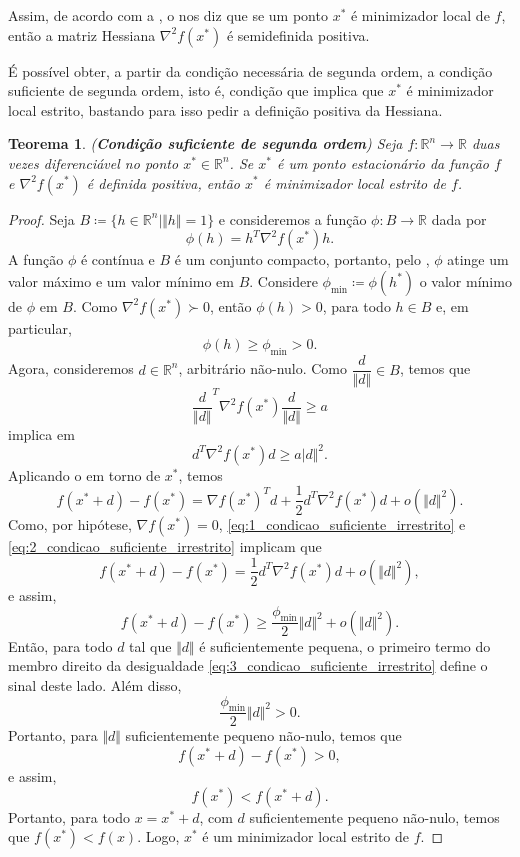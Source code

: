 \documentclass[12pt,a4paper]{scrartcl}
\def\RR{\mathds{R}}
\newtheorem{teo}{Teorema}
\theoremstyle{definition}%
\begin{document}
Assim, de acordo com a , o  nos diz que se um ponto $x^{*}$ é minimizador local de $f$, então a matriz Hessiana $\nabla^{2} f(x^{*})$ é semidefinida positiva.

É possível obter, a partir da condição necessária de segunda ordem, a condição suficiente de segunda ordem, isto é, condição que implica que $x^{*}$ é minimizador local estrito, bastando para isso pedir a definição positiva da Hessiana.

\begin{teo}(\textbf{Condição suficiente de segunda ordem}) \label{teo:condicao_suficiente_irrestrito}
Seja $f:\RR^{n} \rightarrow \RR$ duas vezes diferenciável no ponto $x^{*} \in \RR^{n}$. Se $x^{*}$ é um ponto estacionário da função $f$ e $\nabla^{2} f(x^{*})$ é definida positiva, então $x^{*}$ é minimizador local estrito de $f$.
\end{teo}
\begin{proof}
Seja $B \coloneqq \{ h\in \RR^{n} \mid \Vert h \Vert =1 \}$ e consideremos a função $\phi : B \rightarrow \RR$ dada por
\[
\phi (h) = h^{T} \nabla^{2} f(x^{*})h.
\]
A função $\phi$ é contínua e $B$ é um conjunto compacto, portanto, pelo , $\phi$ atinge um valor máximo e um valor mínimo em $B$. Considere $\phi_{\min} \coloneqq \phi(h^{*})$ o valor mínimo de $\phi$ em $B$. Como $\nabla^{2} f(x^{*}) \succ 0$, então $\phi(h) >0$, para todo $h\in B$ e, em particular,
\[
\phi(h) \geq \phi_{\min} >0.
\]
Agora, consideremos $d\in \RR^{n}$, arbitrário não-nulo. Como $\dfrac{d}{\Vert d \Vert} \in B$, temos que
\[
{\dfrac{d}{\Vert d \Vert}}^{T} \nabla^{2} f(x^{*})\dfrac{d}{\Vert d \Vert} \geq a
\]
implica em
\[ \label{eq:1_condicao_suficiente_irrestrito}
d^{T}\nabla^{2} f(x^{*})d \geq a\vert d\Vert^{2} .
\]
Aplicando o  em torno de $x^{*}$, temos
\[\label{eq:2_condicao_suficiente_irrestrito}
f(x^{*}+d) - f(x^{*}) = \nabla f(x^{*})^{T}d + \dfrac{1}{2} d^{T}\nabla^{2} f(x^{*})d + o(\Vert d \Vert^{2}).
\]
Como, por hipótese, $\nabla f(x^{*}) = 0$, \eqref{eq:1_condicao_suficiente_irrestrito} e \eqref{eq:2_condicao_suficiente_irrestrito} implicam que
\[ 
f(x^{*}+d) - f(x^{*}) = \dfrac{1}{2} d^{T}\nabla^{2} f(x^{*})d + o(\Vert d \Vert^{2}) ,
\]
e assim, 
\[ \label{eq:3_condicao_suficiente_irrestrito}
f(x^{*}+d) - f(x^{*}) \geq \dfrac{\phi_{\min}}{2}\Vert d \Vert^{2} + o(\Vert d \Vert^{2}) .
\]
Então, para todo $d$ tal que $\Vert d \Vert$ é suficientemente pequena, o primeiro termo do membro direito da desigualdade \eqref{eq:3_condicao_suficiente_irrestrito} define o sinal deste lado. Além disso,
\[
\dfrac{\phi_{\min}}{2}\Vert d \Vert^{2} >0.
\]
Portanto, para $\Vert d \Vert$ suficientemente pequeno não-nulo, temos que 
\[
f(x^{*} + d) - f(x^{*}) >0,
\]
e assim,
\[
f(x^{*}) < f(x^{*} + d).
\]
Portanto, para todo $x = x^{*} + d$, com $d$ suficientemente pequeno não-nulo, temos que $f(x^{*}) < f(x)$. Logo, $x^{*}$ é um minimizador local estrito de $f$.
\end{proof}
\end{document}
